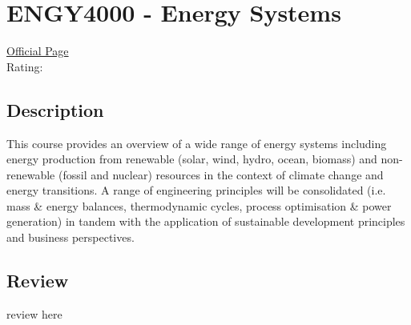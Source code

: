 \hypertarget{ENGY4000}{\section{ENGY4000 - Energy Systems}}

\large
\textcolor{turbo_purple}{\href{https://my.uq.edu.au/programs-courses/course.html?course_code=ENGY4000}{Official Page}} \\
Rating: \cstar\cstar\cstar\cstar\ostar

\normalsize
\subsection*{Description}
This course provides an overview of a wide range of energy systems including energy production from renewable (solar, wind, hydro, ocean, biomass) and non-renewable (fossil and nuclear) resources in the context of climate change and energy transitions.
A range of engineering principles will be consolidated (i.e. mass \& energy balances, thermodynamic cycles, process optimisation \& power generation) in tandem with the application of sustainable development principles and business perspectives.

\subsection*{Review}
review here
